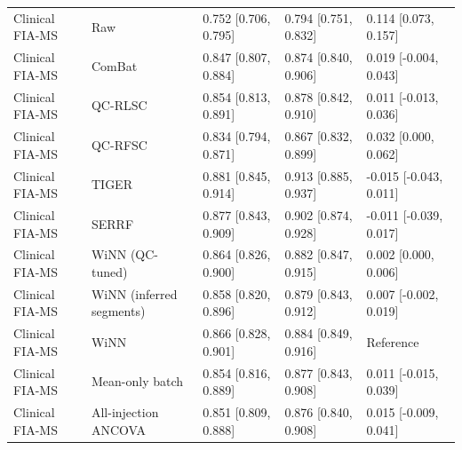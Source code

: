 \begin{landscape}
\begin{longtable}{p{2.7cm}p{3.4cm}p{4.3cm}p{4.3cm}p{4.8cm}}
Clinical FIA-MS & Raw & 0.752 [0.706, 0.795] & 0.794 [0.751, 0.832] & 0.114 [0.073, 0.157] \\
Clinical FIA-MS & ComBat & 0.847 [0.807, 0.884] & 0.874 [0.840, 0.906] & 0.019 [-0.004, 0.043] \\
Clinical FIA-MS & QC-RLSC & 0.854 [0.813, 0.891] & 0.878 [0.842, 0.910] & 0.011 [-0.013, 0.036] \\
Clinical FIA-MS & QC-RFSC & 0.834 [0.794, 0.871] & 0.867 [0.832, 0.899] & 0.032 [0.000, 0.062] \\
Clinical FIA-MS & TIGER & 0.881 [0.845, 0.914] & 0.913 [0.885, 0.937] & -0.015 [-0.043, 0.011] \\
Clinical FIA-MS & SERRF & 0.877 [0.843, 0.909] & 0.902 [0.874, 0.928] & -0.011 [-0.039, 0.017] \\
Clinical FIA-MS & WiNN (QC-tuned) & 0.864 [0.826, 0.900] & 0.882 [0.847, 0.915] & 0.002 [0.000, 0.006] \\
Clinical FIA-MS & WiNN (inferred segments) & 0.858 [0.820, 0.896] & 0.879 [0.843, 0.912] & 0.007 [-0.002, 0.019] \\
Clinical FIA-MS & WiNN & 0.866 [0.828, 0.901] & 0.884 [0.849, 0.916] & Reference \\
Clinical FIA-MS & Mean-only batch & 0.854 [0.816, 0.889] & 0.877 [0.843, 0.908] & 0.011 [-0.015, 0.039] \\
Clinical FIA-MS & All-injection ANCOVA & 0.851 [0.809, 0.888] & 0.876 [0.840, 0.908] & 0.015 [-0.009, 0.041] \\
\end{longtable}
\end{landscape}
